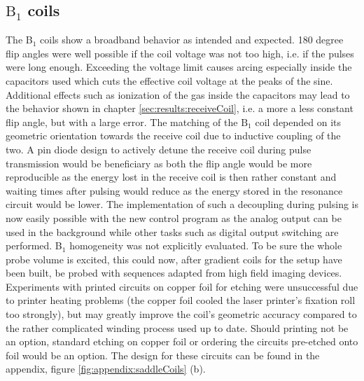         \subsection{$\mathrm{B}_1$ coils}
        The B$_1$ coils show a broadband behavior as intended and expected. 180 degree flip angles were well possible if the coil voltage was not too high, i.e. if the pulses were long enough. Exceeding the voltage limit causes arcing especially inside the capacitors used which cuts the effective coil voltage at the peaks of the sine. Additional effects such as ionization of the gas inside the capacitors may lead to the behavior shown in chapter \ref{sec:results:receiveCoil}, i.e. a more a less constant flip angle, but with a large error.
            The matching of the $\mathrm{B_1}$ coil depended on its geometric orientation towards the receive coil due to inductive coupling of the two. A pin diode design to actively detune the receive coil during pulse transmission would be beneficiary as both the flip angle would be more reproducible as the energy lost in the receive coil is then rather constant and waiting times after pulsing would reduce as the energy stored in the resonance circuit would be lower. The implementation of such a decoupling during pulsing is now easily possible with the new control program as the analog output can be used in the background while other tasks such as digital output switching are performed.
            B$_1$ homogeneity was not explicitly evaluated. To be sure the whole probe volume is excited, this could now, after gradient coils for the setup have been built, be probed with sequences adapted from high field imaging devices.
            Experiments with printed circuits on copper foil for etching were unsuccessful due to printer heating problems (the copper foil cooled the laser printer's fixation roll too strongly), but may greatly improve the coil's geometric accuracy compared to the rather complicated winding process used up to date. Should printing not be an option, standard etching on copper foil or ordering the circuits pre-etched onto foil would be an option.  The design for these circuits can be found in the appendix, figure \ref{fig:appendix:saddleCoils} (b).
